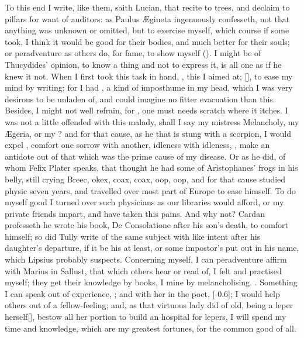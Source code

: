 {To this end I write, like them, saith Lucian, that recite to trees, and
declaim to pillars for want of auditors: as Paulus \AE{}gineta
ingenuously confesseth, not that anything was unknown or omitted, but
to exercise myself, which course if some took, I think it would be good
for their bodies, and much better for their souls; or peradventure as
others do, for fame, to show myself (). I might be of Thucydides' opinion, to know
a thing and not to express it, is all one as if he knew it not. When I
first took this task in hand, , this I aimed at; [\baselineskip],
to ease my mind by writing; for I had , a
kind of imposthume in my head, which I was very desirous to be unladen
of, and could imagine no fitter evacuation than this. Besides, I might
not well refrain, for , one must needs scratch
where it itches. I was not a little offended with this malady, shall I
say my mistress Melancholy, my \AE{}geria, or my ? and for
that cause, as he that is stung with a scorpion, I would expel , comfort one sorrow with another, idleness with idleness, , make an antidote out of that which was the prime
cause of my disease. Or as he did, of whom Felix Plater speaks,
that thought he had some of Aristophanes' frogs in his belly, still
crying Breec, okex, coax, coax, oop, oop, and for that cause studied
physic seven years, and travelled over most part of Europe to ease
himself. To do myself good I turned over such physicians as our
libraries would afford, or my private friends impart, and have
taken this pains. And why not? Cardan professeth he wrote his book, De
Consolatione after his son's death, to comfort himself; so did Tully
write of the same subject with like intent after his daughter's
departure, if it be his at least, or some impostor's put out in his
name, which Lipsius probably suspects. Concerning myself, I can
peradventure affirm with Marius in Sallust, that which others hear
or read of, I felt and practised myself; they get their knowledge by
books, I mine by melancholising. . Something I can
speak out of experience, ; and with
her in the poet, [-0.6\baselineskip]; I would
help others out of a fellow-feeling; and, as that virtuous lady did of
old, being a leper herself[\baselineskip], bestow all her portion to build an
hospital for lepers, I will spend my time and knowledge, which are my
greatest fortunes, for the common good of all.

}
